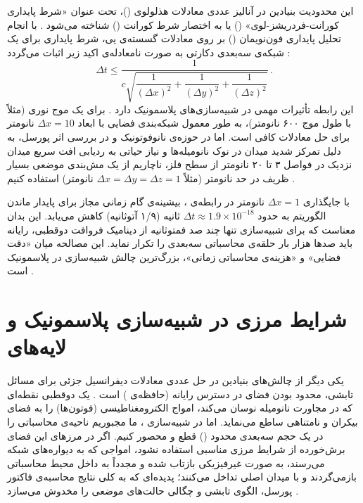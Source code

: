 \documentclass[12pt,a4paper]{report}
\begin{document}
این محدودیت بنیادین در آنالیز عددی معادلات هذلولوی ()، تحت عنوان «شرط پایداری کورانت-فردریشز-لوی» () یا به اختصار شرط کورانت () شناخته می‌شود \cite{taflove}. با انجام تحلیل پایداری فون‌نویمان () بر روی معادلات گسسته‌ی یی، شرط پایداری برای یک شبکه‌ی سه‌بعدی دکارتی به صورت نامعادله‌ی اکید زیر اثبات می‌گردد \cite{taflove}:
\begin{equation}
\Delta t\le\frac{1}{c\sqrt{\dfrac{1}{(\Delta x)^2}+\dfrac{1}{(\Delta y)^2}+\dfrac{1}{(\Delta z)^2}}}\,.
\end{equation}
این رابطه تأثیرات مهمی در شبیه‌سازی‌های پلاسمونیک دارد \cite{maier,taflove}. برای یک موج نوری (مثلاً با طول موج ۶۰۰ نانومتر)، به طور معمول شبکه‌بندی فضایی با ابعاد $\Delta x=10$ نانومتر برای حل معادلات کافی است. اما در حوزه‌ی نانوفوتونیک و در بررسی اثر پورسل، به دلیل تمرکز شدید میدان در نوک نانومیله‌ها و نیاز حیاتی به ردیابی افت سریع میدان نزدیک در فواصل ۳ تا ۲۰ نانومتر از سطح فلز، ناچاریم از یک مش‌بندی موضعی بسیار ظریف در حد نانومتر (مثلاً $\Delta x=\Delta y=\Delta z=1$ نانومتر) استفاده کنیم \cite{novotny,taflove}.

با جایگذاری $\Delta x=1$ نانومتر در رابطه‌ی ، بیشینه‌ی گام زمانی مجاز برای پایدار ماندن الگوریتم به حدود $\Delta t\approx1.9\times10^{-18}$ ثانیه (۱/۹ آتوثانیه) کاهش می‌یابد. این بدان معناست که برای شبیه‌سازی تنها چند صد فمتوثانیه از دینامیک فروافت دوقطبی، رایانه باید صدها هزار بار حلقه‌ی محاسباتی سه‌بعدی را تکرار نماید. این مصالحه میان «دقت فضایی» و «هزینه‌ی محاسباتی زمانی»، بزرگ‌ترین چالش شبیه‌سازی  در پلاسمونیک است \cite{taflove,maier}.

\section{شرایط مرزی در شبیه‌سازی پلاسمونیک و لایه‌های }
یکی دیگر از چالش‌های بنیادین در حل عددی معادلات دیفرانسیل جزئی برای مسائل تابشی، محدود بودن فضای در دسترس رایانه (حافظه‌ی ) است \cite{taflove}. یک دوقطبی نقطه‌ای که در مجاورت نانومیله نوسان می‌کند، امواج الکترومغناطیسی (فوتون‌ها) را به فضای بیکران و نامتناهی ساطع می‌نماید. اما در شبیه‌سازی ، ما مجبوریم ناحیه‌ی محاسباتی را در یک حجم سه‌بعدی محدود () قطع و محصور کنیم. اگر در مرزهای این فضای برش‌خورده از شرایط مرزی مناسبی استفاده نشود، امواجی که به دیواره‌های شبکه می‌رسند، به صورت غیرفیزیکی بازتاب شده و مجدداً به داخل محیط محاسباتی بازمی‌گردند و با میدان اصلی تداخل می‌کنند؛ پدیده‌ای که به کلی نتایج محاسبه‌ی فاکتور پورسل، الگوی تابشی و چگالی حالت‌های موضعی را مخدوش می‌سازد \cite{taflove,novotny}.
\end{document}
